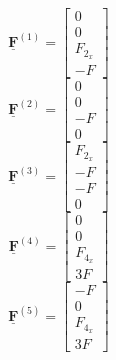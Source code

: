 \documentclass[12pt,a4paper]{article}
\def\vec#1{\underline{\mathbf{#1}}}
\begin{document}
\begin{multicols}{7}
    \noindent
    \begin{equation*}
        \vec{F}^{\left(1\right)}=
        \begin{bmatrix}
            0       \\
            0       \\
            F_{2_x} \\
            -F
        \end{bmatrix}
    \end{equation*}
    \columnbreak
    \begin{equation*}
        \vec{F}^{\left(2\right)}=
        \begin{bmatrix}
            0  \\
            0  \\
            -F \\
            0
        \end{bmatrix}
    \end{equation*}
    \columnbreak
    \begin{equation*}
        \vec{F}^{\left(3\right)}=
        \begin{bmatrix}
            F_{2_x} \\
            -F      \\
            -F      \\
            0
        \end{bmatrix}
    \end{equation*}
    \columnbreak
    \begin{equation*}
        \vec{F}^{\left(4\right)}=
        \begin{bmatrix}
            0       \\
            0       \\
            F_{4_x} \\
            3 F
        \end{bmatrix}
    \end{equation*}
    \begin{equation*}
        \vec{F}^{\left(5\right)}=
        \begin{bmatrix}
            -F      \\
            0       \\
            F_{4_x} \\
            3 F
        \end{bmatrix}

\end{equation*}
\end{multicols}
\end{document}

